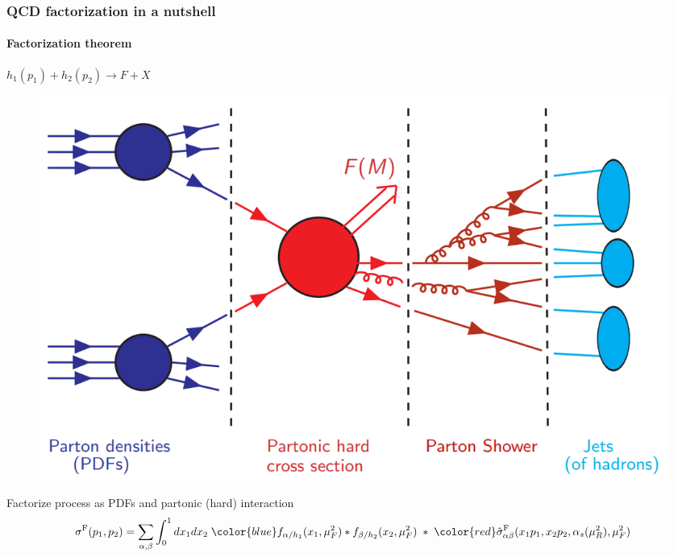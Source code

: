 \documentclass[aspectratio=43]{beamer}
\begin{document}
\begin{frame}

	\frametitle{QCD factorization in a nutshell}
	\framesubtitle{Factorization theorem}

	\center \footnotesize $h_{1}(p_{1}) + h_{2}(p_{2}) \rightarrow F + X$ 
	
	\begin{figure}
		\includegraphics[width = 7 cm]{plots/section1/factorization_1.png}
	\end{figure}
	
	\center \footnotesize {Factorize process as {\color{blue}PDFs} and {\color{red} partonic (hard) interaction}	
	\begin{equation}
		\sigma^{\textrm{F}}(p_{1}, p_{2}) = \sum_{\alpha, \beta}
		\int_{0}^{1} dx_{1} dx_{2} \; {\color{blue} f_{\alpha/h_{1}}(x_{1}, \mu_{F}^{2}) \ast f_{\beta/h_{2}}(x_{2}, \mu_{F}^{2})}
		\; \ast \;  
		{\color{red}\hat{\sigma}^{\textrm{F}}_{\alpha \beta}(x_{1}p_{1}, x_{2}p_{2}, \alpha_{s}(\mu_{R}^{2}), \mu_{F}^{2})} \nonumber
	\end{equation}}
\end{frame}
\end{document}
